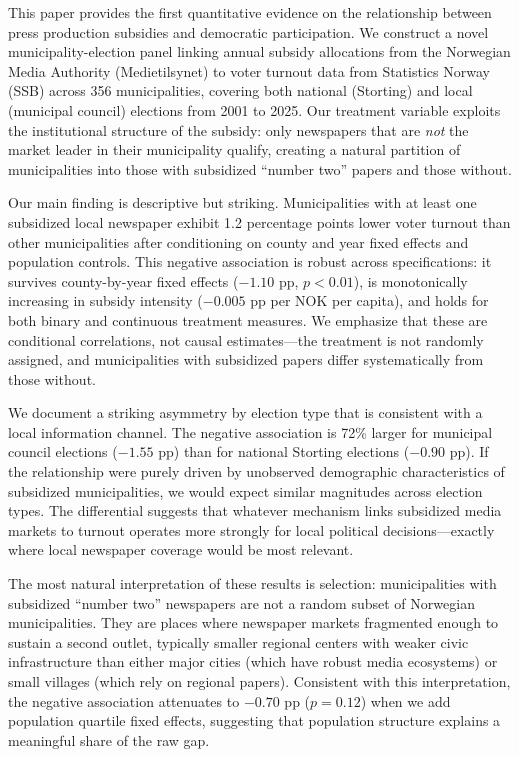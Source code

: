 \documentclass[12pt]{article}
\begin{document}
This paper provides the first quantitative evidence on the relationship between press production subsidies and democratic participation. We construct a novel municipality-election panel linking annual subsidy allocations from the Norwegian Media Authority (Medietilsynet) to voter turnout data from Statistics Norway (SSB) across 356 municipalities, covering both national (Storting) and local (municipal council) elections from 2001 to 2025. Our treatment variable exploits the institutional structure of the subsidy: only newspapers that are \textit{not} the market leader in their municipality qualify, creating a natural partition of municipalities into those with subsidized ``number two'' papers and those without.

Our main finding is descriptive but striking. Municipalities with at least one subsidized local newspaper exhibit 1.2 percentage points lower voter turnout than other municipalities after conditioning on county and year fixed effects and population controls. This negative association is robust across specifications: it survives county-by-year fixed effects ($-1.10$ pp, $p < 0.01$), is monotonically increasing in subsidy intensity ($-0.005$ pp per NOK per capita), and holds for both binary and continuous treatment measures. We emphasize that these are conditional correlations, not causal estimates---the treatment is not randomly assigned, and municipalities with subsidized papers differ systematically from those without.

We document a striking asymmetry by election type that is consistent with a local information channel. The negative association is 72\% larger for municipal council elections ($-1.55$ pp) than for national Storting elections ($-0.90$ pp). If the relationship were purely driven by unobserved demographic characteristics of subsidized municipalities, we would expect similar magnitudes across election types. The differential suggests that whatever mechanism links subsidized media markets to turnout operates more strongly for local political decisions---exactly where local newspaper coverage would be most relevant.

The most natural interpretation of these results is selection: municipalities with subsidized ``number two'' newspapers are not a random subset of Norwegian municipalities. They are places where newspaper markets fragmented enough to sustain a second outlet, typically smaller regional centers with weaker civic infrastructure than either major cities (which have robust media ecosystems) or small villages (which rely on regional papers). Consistent with this interpretation, the negative association attenuates to $-0.70$ pp ($p = 0.12$) when we add population quartile fixed effects, suggesting that population structure explains a meaningful share of the raw gap.
\end{document}
